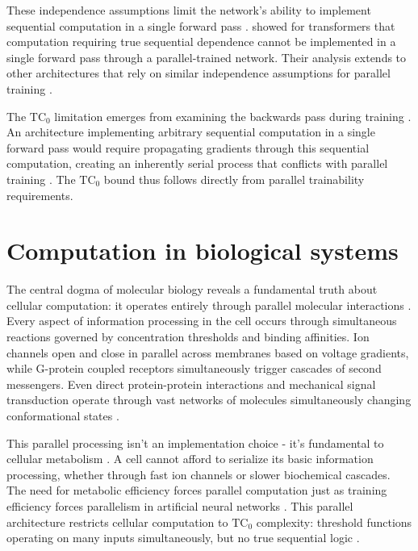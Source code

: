 \documentclass[12pt]{article}
\begin{document}
These independence assumptions limit the network's ability to implement sequential computation in a single forward pass \cite{wei2022chain}. \cite{merrill2023parallelism} showed for transformers that computation requiring true sequential dependence cannot be implemented in a single forward pass through a parallel-trained network. Their analysis extends to other architectures that rely on similar independence assumptions for parallel training \cite{stillman2023generative}.

The $\text{TC}_0$ limitation emerges from examining the backwards pass during training \cite{jung2020new}. An architecture implementing arbitrary sequential computation in a single forward pass would require propagating gradients through this sequential computation, creating an inherently serial process that conflicts with parallel training \cite{zhu2024overcoming}. The $\text{TC}_0$ bound thus follows directly from parallel trainability requirements.

\section{Computation in biological systems}

The central dogma of molecular biology reveals a fundamental truth about cellular computation: it operates entirely through parallel molecular interactions \cite{wang2023parallel,cai2024efficient,fu2023scgrn}. Every aspect of information processing in the cell occurs through simultaneous reactions governed by concentration thresholds and binding affinities. Ion channels open and close in parallel across membranes based on voltage gradients, while G-protein coupled receptors simultaneously trigger cascades of second messengers. Even direct protein-protein interactions and mechanical signal transduction operate through vast networks of molecules simultaneously changing conformational states \cite{berridge2014cell}.

This parallel processing isn't an implementation choice - it's fundamental to cellular metabolism \cite{cai2024efficient,hoel2020emergence}. A cell cannot afford to serialize its basic information processing, whether through fast ion channels or slower biochemical cascades. The need for metabolic efficiency forces parallel computation just as training efficiency forces parallelism in artificial neural networks \cite{barrett2019analyzing}. This parallel architecture restricts cellular computation to $\text{TC}_0$ complexity: threshold functions operating on many inputs simultaneously, but no true sequential logic \cite{wang2023parallel}.
\end{document}
